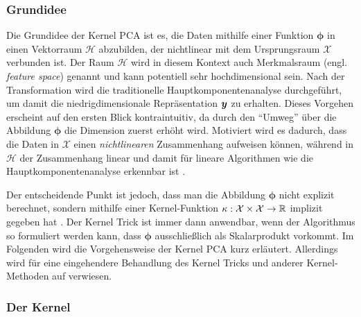 \subsubsection{Grundidee}
\label{ch:MethodenDerDimRed:statistisch:kPCA:Grundidee}

Die Grundidee der Kernel PCA ist es, die Daten mithilfe einer Funktion $\bm{\phi}$ in einen
Vektorraum $\mathcal{H}$ abzubilden, der nichtlinear mit dem Ursprungsraum $\mathcal{X}$ verbunden
ist. Der Raum $\mathcal{H}$ wird in diesem Kontext auch Merkmalsraum (engl. \textit{feature space})
genannt und kann potentiell sehr hochdimensional sein. Nach der Transformation wird die
traditionelle Hauptkomponentenanalyse durchgeführt, um damit die niedrigdimensionale Repräsentation
$\bm{y}$ zu erhalten. Dieses Vorgehen erscheint auf den ersten Blick kontraintuitiv, da durch
den \enquote{Umweg} über die Abbildung $\bm{\phi}$ die Dimension zuerst erhöht wird. Motiviert wird
es dadurch, dass die Daten in $\mathcal{X}$ einen \textit{nichtlinearen} Zusammenhang aufweisen
können, während in $\mathcal{H}$ der Zusammenhang linear und damit für lineare Algorithmen wie die
Hauptkomponentenanalyse erkennbar ist \parencite[vgl.][26]{ShaweTaylor.2011}.

Der entscheidende Punkt ist jedoch, dass man die Abbildung $\bm{\phi}$ nicht explizit berechnet,
sondern mithilfe einer Kernel-Funktion $\kappa: \mathcal{X} \times \mathcal{X} \rightarrow \mathbb{R}$
implizit gegeben hat \parencites[586 -- 588]{Bishop.2006}[583]{Scholkopf.1997}. Der Kernel Trick ist immer dann anwendbar,
wenn der Algorithmus so formuliert werden kann, dass $\bm{\phi}$ ausschließlich als Skalarprodukt
vorkommt. Im Folgenden wird die Vorgehensweise der Kernel PCA kurz erläutert. Allerdings wird für
eine eingehendere Behandlung des Kernel Tricks und anderer Kernel-Methoden auf
\textcite{ShaweTaylor.2011} verwiesen.

\subsubsection{Der Kernel}
\label{ch:MethodenDerDimRed:statistisch:kPCA:KernelFunktion}

